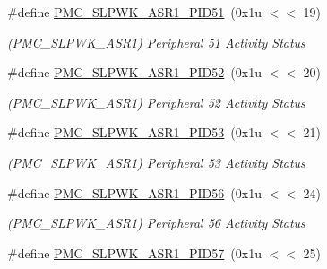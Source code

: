 \begin{DoxyCompactItemize}
\mbox{\label{group__SAME70__PMC_ga79d9a2e4a1cebaf4c5e2fa569cdba3a7}} 
\#define \mbox{\hyperlink{group__SAME70__PMC_ga79d9a2e4a1cebaf4c5e2fa569cdba3a7}{P\+M\+C\+\_\+\+S\+L\+P\+W\+K\+\_\+\+A\+S\+R1\+\_\+\+P\+I\+D51}}~(0x1u $<$$<$ 19)
\begin{DoxyCompactList}\small\item\em (P\+M\+C\+\_\+\+S\+L\+P\+W\+K\+\_\+\+A\+S\+R1) Peripheral 51 Activity Status \end{DoxyCompactList}\item 
\mbox{\label{group__SAME70__PMC_ga59f5331fe305469aa38139c0cf95b61e}} 
\#define \mbox{\hyperlink{group__SAME70__PMC_ga59f5331fe305469aa38139c0cf95b61e}{P\+M\+C\+\_\+\+S\+L\+P\+W\+K\+\_\+\+A\+S\+R1\+\_\+\+P\+I\+D52}}~(0x1u $<$$<$ 20)
\begin{DoxyCompactList}\small\item\em (P\+M\+C\+\_\+\+S\+L\+P\+W\+K\+\_\+\+A\+S\+R1) Peripheral 52 Activity Status \end{DoxyCompactList}\item 
\mbox{\label{group__SAME70__PMC_ga65d68f06f2edea6a4d2b5cfa62c37227}} 
\#define \mbox{\hyperlink{group__SAME70__PMC_ga65d68f06f2edea6a4d2b5cfa62c37227}{P\+M\+C\+\_\+\+S\+L\+P\+W\+K\+\_\+\+A\+S\+R1\+\_\+\+P\+I\+D53}}~(0x1u $<$$<$ 21)
\begin{DoxyCompactList}\small\item\em (P\+M\+C\+\_\+\+S\+L\+P\+W\+K\+\_\+\+A\+S\+R1) Peripheral 53 Activity Status \end{DoxyCompactList}\item 
\mbox{\label{group__SAME70__PMC_ga2676e54cd88cce57d6b1ba09f7c3c866}} 
\#define \mbox{\hyperlink{group__SAME70__PMC_ga2676e54cd88cce57d6b1ba09f7c3c866}{P\+M\+C\+\_\+\+S\+L\+P\+W\+K\+\_\+\+A\+S\+R1\+\_\+\+P\+I\+D56}}~(0x1u $<$$<$ 24)
\begin{DoxyCompactList}\small\item\em (P\+M\+C\+\_\+\+S\+L\+P\+W\+K\+\_\+\+A\+S\+R1) Peripheral 56 Activity Status \end{DoxyCompactList}\item 
\mbox{\label{group__SAME70__PMC_ga67274aa2482ed51d2cd0e0cc6d41a1d5}} 
\#define \mbox{\hyperlink{group__SAME70__PMC_ga67274aa2482ed51d2cd0e0cc6d41a1d5}{P\+M\+C\+\_\+\+S\+L\+P\+W\+K\+\_\+\+A\+S\+R1\+\_\+\+P\+I\+D57}}~(0x1u $<$$<$ 25)
$$
\end{DoxyCompactItemize}
